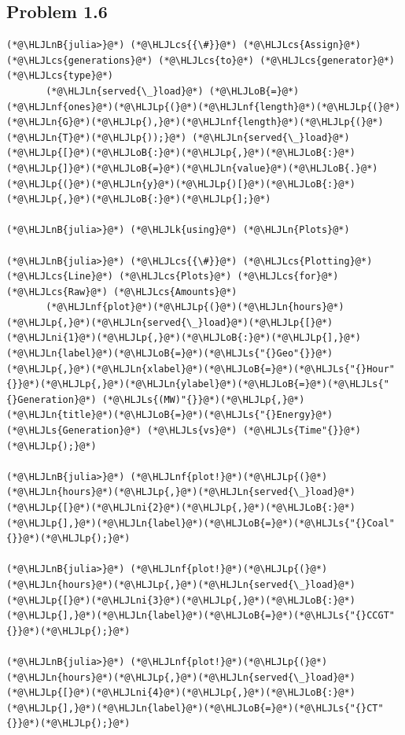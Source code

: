 \documentclass[12pt,a4paper]{article}
\newcommand{\HLJLk}[1]{\textcolor[RGB]{148,91,176}{\textbf{#1}}}
\newcommand{\HLJLn}[1]{#1}
\newcommand{\HLJLnf}[1]{\textcolor[RGB]{66,102,213}{#1}}
\newcommand{\HLJLs}[1]{\textcolor[RGB]{201,61,57}{#1}}
\newcommand{\HLJLnB}[1]{\textcolor[RGB]{59,151,46}{#1}}
\newcommand{\HLJLni}[1]{\textcolor[RGB]{59,151,46}{#1}}
\newcommand{\HLJLoB}[1]{\textcolor[RGB]{102,102,102}{\textbf{#1}}}
\newcommand{\HLJLp}[1]{#1}
\newcommand{\HLJLcs}[1]{\textcolor[RGB]{153,153,119}{\textit{#1}}}
\begin{document}
\subsection{Problem 1.6}

\begin{lstlisting}
(*@\HLJLnB{julia>}@*) (*@\HLJLcs{{\#}}@*) (*@\HLJLcs{Assign}@*) (*@\HLJLcs{generations}@*) (*@\HLJLcs{to}@*) (*@\HLJLcs{generator}@*) (*@\HLJLcs{type}@*)
       (*@\HLJLn{served{\_}load}@*) (*@\HLJLoB{=}@*) (*@\HLJLnf{ones}@*)(*@\HLJLp{(}@*)(*@\HLJLnf{length}@*)(*@\HLJLp{(}@*)(*@\HLJLn{G}@*)(*@\HLJLp{),}@*)(*@\HLJLnf{length}@*)(*@\HLJLp{(}@*)(*@\HLJLn{T}@*)(*@\HLJLp{));}@*) (*@\HLJLn{served{\_}load}@*)(*@\HLJLp{[}@*)(*@\HLJLoB{:}@*)(*@\HLJLp{,}@*)(*@\HLJLoB{:}@*)(*@\HLJLp{]}@*)(*@\HLJLoB{=}@*)(*@\HLJLn{value}@*)(*@\HLJLoB{.}@*)(*@\HLJLp{(}@*)(*@\HLJLn{y}@*)(*@\HLJLp{)[}@*)(*@\HLJLoB{:}@*)(*@\HLJLp{,}@*)(*@\HLJLoB{:}@*)(*@\HLJLp{];}@*)

(*@\HLJLnB{julia>}@*) (*@\HLJLk{using}@*) (*@\HLJLn{Plots}@*)

(*@\HLJLnB{julia>}@*) (*@\HLJLcs{{\#}}@*) (*@\HLJLcs{Plotting}@*) (*@\HLJLcs{Line}@*) (*@\HLJLcs{Plots}@*) (*@\HLJLcs{for}@*) (*@\HLJLcs{Raw}@*) (*@\HLJLcs{Amounts}@*)
       (*@\HLJLnf{plot}@*)(*@\HLJLp{(}@*)(*@\HLJLn{hours}@*)(*@\HLJLp{,}@*)(*@\HLJLn{served{\_}load}@*)(*@\HLJLp{[}@*)(*@\HLJLni{1}@*)(*@\HLJLp{,}@*)(*@\HLJLoB{:}@*)(*@\HLJLp{],}@*)(*@\HLJLn{label}@*)(*@\HLJLoB{=}@*)(*@\HLJLs{"{}Geo"{}}@*)(*@\HLJLp{,}@*)(*@\HLJLn{xlabel}@*)(*@\HLJLoB{=}@*)(*@\HLJLs{"{}Hour"{}}@*)(*@\HLJLp{,}@*)(*@\HLJLn{ylabel}@*)(*@\HLJLoB{=}@*)(*@\HLJLs{"{}Generation}@*) (*@\HLJLs{(MW)"{}}@*)(*@\HLJLp{,}@*)(*@\HLJLn{title}@*)(*@\HLJLoB{=}@*)(*@\HLJLs{"{}Energy}@*) (*@\HLJLs{Generation}@*) (*@\HLJLs{vs}@*) (*@\HLJLs{Time"{}}@*)(*@\HLJLp{);}@*)

(*@\HLJLnB{julia>}@*) (*@\HLJLnf{plot!}@*)(*@\HLJLp{(}@*)(*@\HLJLn{hours}@*)(*@\HLJLp{,}@*)(*@\HLJLn{served{\_}load}@*)(*@\HLJLp{[}@*)(*@\HLJLni{2}@*)(*@\HLJLp{,}@*)(*@\HLJLoB{:}@*)(*@\HLJLp{],}@*)(*@\HLJLn{label}@*)(*@\HLJLoB{=}@*)(*@\HLJLs{"{}Coal"{}}@*)(*@\HLJLp{);}@*)

(*@\HLJLnB{julia>}@*) (*@\HLJLnf{plot!}@*)(*@\HLJLp{(}@*)(*@\HLJLn{hours}@*)(*@\HLJLp{,}@*)(*@\HLJLn{served{\_}load}@*)(*@\HLJLp{[}@*)(*@\HLJLni{3}@*)(*@\HLJLp{,}@*)(*@\HLJLoB{:}@*)(*@\HLJLp{],}@*)(*@\HLJLn{label}@*)(*@\HLJLoB{=}@*)(*@\HLJLs{"{}CCGT"{}}@*)(*@\HLJLp{);}@*)

(*@\HLJLnB{julia>}@*) (*@\HLJLnf{plot!}@*)(*@\HLJLp{(}@*)(*@\HLJLn{hours}@*)(*@\HLJLp{,}@*)(*@\HLJLn{served{\_}load}@*)(*@\HLJLp{[}@*)(*@\HLJLni{4}@*)(*@\HLJLp{,}@*)(*@\HLJLoB{:}@*)(*@\HLJLp{],}@*)(*@\HLJLn{label}@*)(*@\HLJLoB{=}@*)(*@\HLJLs{"{}CT"{}}@*)(*@\HLJLp{);}@*)


\end{lstlisting}
\end{document}
